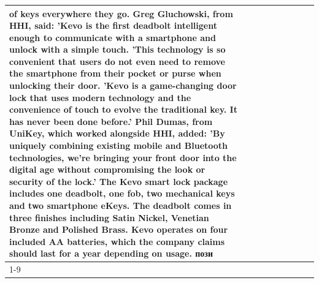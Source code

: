 \begin{table}[H]
\begin{tabular}{lllrlllll}
of keys everywhere they go. Greg Gluchowski, from HHI, said: 'Kevo is the first deadbolt intelligent enough to communicate with a smartphone and unlock with a simple touch. 'This technology is so convenient that users do not even need to remove the smartphone from their pocket or purse when unlocking their door. 'Kevo is a game-changing door lock that uses modern technology and the convenience of touch to evolve the traditional key. It has never been done before.' Phil Dumas, from UniKey, which worked alongside HHI, added: 'By uniquely combining existing mobile and Bluetooth technologies, we’re bringing your front door into the digital age without compromising the look or security of the lock.' The Kevo smart lock package includes one deadbolt, one fob, two mechanical keys and two smartphone eKeys. The deadbolt comes in three finishes including Satin Nickel, Venetian Bronze and Polished Brass. Kevo operates on four included AA batteries, which the company claims should last for a year depending on usage. пози \\
\cline{1-9}

\end{tabular}
\end{table}
